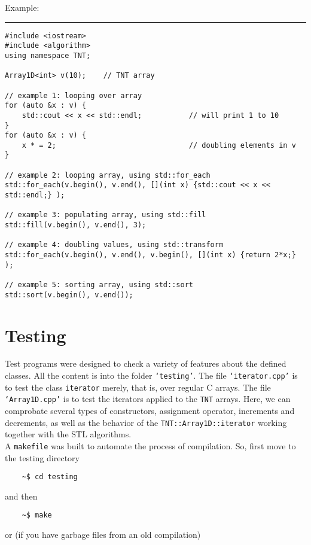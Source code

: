 Example:
\\
\rule{\textwidth}{0.5pt}
\begin{verbatim}
#include <iostream>
#include <algorithm>
using namespace TNT;

Array1D<int> v(10);    // TNT array

// example 1: looping over array
for (auto &x : v) {
    std::cout << x << std::endl;           // will print 1 to 10
}
for (auto &x : v) {
    x * = 2;                               // doubling elements in v
}

// example 2: looping array, using std::for_each
std::for_each(v.begin(), v.end(), [](int x) {std::cout << x << std::endl;} );

// example 3: populating array, using std::fill
std::fill(v.begin(), v.end(), 3);

// example 4: doubling values, using std::transform
std::for_each(v.begin(), v.end(), v.begin(), [](int x) {return 2*x;} );

// example 5: sorting array, using std::sort
std::sort(v.begin(), v.end());
\end{verbatim}

\section{Testing}

Test programs were designed to check a variety of features about the defined classes. All the content is into the folder {\tt `testing'}. The file {\tt `iterator.cpp'} is to test the class {\tt iterator} merely, that is, over regular C arrays. The file {\tt `Array1D.cpp'} is to test the iterators applied to the {\tt TNT} arrays. Here, we can comprobate several types of constructors, assignment operator, increments and decrements, as well as the behavior of the {\tt TNT::Array1D::iterator} working together with the STL algorithms.
\\

A {\tt makefile} was built to automate the process of compilation. So, first move to the testing directory
\begin{verbatim}
    ~$ cd testing
\end{verbatim}

and then

\begin{verbatim}
    ~$ make
\end{verbatim}

or (if you have garbage files from an old compilation)

